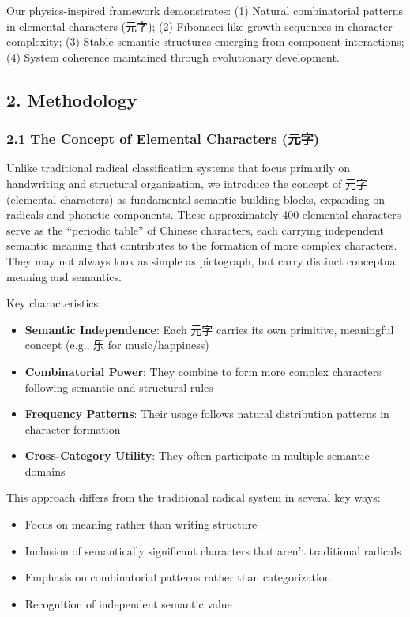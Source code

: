 \documentclass[
  11pt,
  letterpaper,
]{article}
\providecommand{\tightlist}{%
  \setlength{\itemsep}{0pt}\setlength{\parskip}{0pt}}
\begin{document}
Our physics-inspired framework demonstrates: (1) Natural combinatorial
patterns in elemental characters (元字); (2) Fibonacci-like growth
sequences in character complexity; (3) Stable semantic structures
emerging from component interactions; (4) System coherence maintained
through evolutionary development.

\hypertarget{methodology}{%
\subsection{2. Methodology}\label{methodology}}

\hypertarget{the-concept-of-elemental-characters-ux5143ux5b57}{%
\subsubsection{2.1 The Concept of Elemental Characters
(元字)}\label{the-concept-of-elemental-characters-ux5143ux5b57}}

Unlike traditional radical classification systems that focus primarily
on handwriting and structural organization, we introduce the concept of
元字 (elemental characters) as fundamental semantic building blocks,
expanding on radicals and phonetic components. These approximately 400
elemental characters serve as the ``periodic table'' of Chinese
characters, each carrying independent semantic meaning that contributes
to the formation of more complex characters. They may not always look as
simple as pictograph, but carry distinct conceptual meaning and
semantics.

Key characteristics:

\begin{itemize}
\tightlist
\item
  \textbf{Semantic Independence}: Each 元字 carries its own primitive,
  meaningful concept (e.g., 乐 for music/happiness)
\item
  \textbf{Combinatorial Power}: They combine to form more complex
  characters following semantic and structural rules
\item
  \textbf{Frequency Patterns}: Their usage follows natural distribution
  patterns in character formation
\item
  \textbf{Cross-Category Utility}: They often participate in multiple
  semantic domains
\end{itemize}

This approach differs from the traditional radical system in several key
ways:

\begin{itemize}
\tightlist
\item
  Focus on meaning rather than writing structure
\item
  Inclusion of semantically significant characters that aren't
  traditional radicals
\item
  Emphasis on combinatorial patterns rather than categorization
\item
  Recognition of independent semantic value
\end{itemize}
\end{document}
